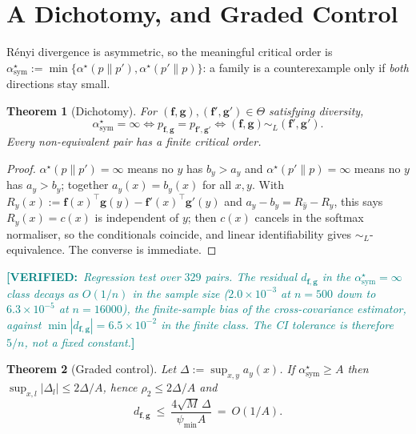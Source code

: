 \documentclass[10pt,letterpaper,twocolumn]{article}
\newcommand{\DONE}[1]{\textcolor{teal}{\small\textbf{[VERIFIED:}~\textit{#1}\textbf{]}}}
\newcommand{\bff}{\mathbf{f}}
\newcommand{\bfg}{\mathbf{g}}
\newcommand{\dfg}{d_{\bff,\bfg}}
\newcommand{\simL}{\sim_{L}}
\theoremstyle{plain}
\newtheorem{theorem}{Theorem}
\theoremstyle{definition}
\theoremstyle{remark}
\begin{document}
\section{A Dichotomy, and Graded Control}
\label{sec:dichotomy}

R\'enyi divergence is asymmetric, so the meaningful critical order is
$\alpha^{\star}_{\mathrm{sym}}:=\min\{\alpha^{\star}(p\|p'),
\alpha^{\star}(p'\|p)\}$: a family is a counterexample only if \emph{both}
directions stay small.

\begin{theorem}[Dichotomy]
\label{thm:dichotomy}
For $(\bff,\bfg),(\bff',\bfg')\in\Theta$ satisfying diversity,
\begin{equation}
\alpha^{\star}_{\mathrm{sym}}=\infty
\iff p_{\bff,\bfg}=p_{\bff',\bfg'}
\iff (\bff,\bfg)\simL(\bff',\bfg').
\end{equation}
Every non-equivalent pair has a \emph{finite} critical order.
\end{theorem}

\begin{proof}
$\alpha^{\star}(p\|p')=\infty$ means no $y$ has $b_{y}>a_{y}$ and
$\alpha^{\star}(p'\|p)=\infty$ means no $y$ has $a_{y}>b_{y}$; together
$a_{y}(x)=b_{y}(x)$ for all $x,y$. With
$R_{y}(x):=\bff(x)^{\top}\bfg(y)-\bff'(x)^{\top}\bfg'(y)$ and
$a_{y}-b_{y}=R_{\hat y}-R_{y}$, this says $R_{y}(x)=c(x)$ is independent of
$y$; then $c(x)$ cancels in the softmax normaliser, so the conditionals
coincide, and linear identifiability gives $\simL$-equivalence. The converse is
immediate.
\end{proof}

\DONE{Regression test over $329$ pairs. The residual $\dfg$ in the
$\alpha^{\star}_{\mathrm{sym}}=\infty$ class decays as $O(1/n)$ in the sample
size ($2.0\!\times\!10^{-3}$ at $n{=}500$ down to $6.3\!\times\!10^{-5}$ at
$n{=}16000$), the finite-sample bias of the cross-covariance estimator, against
$\min|\dfg|=6.5\times10^{-2}$ in the finite class. The CI tolerance is therefore
$5/n$, not a fixed constant.}

\begin{theorem}[Graded control]
\label{thm:graded}
Let $\Delta:=\sup_{x,y}a_{y}(x)$. If $\alpha^{\star}_{\mathrm{sym}}\ge A$ then
$\sup_{x,l}|\Delta_{l}|\le2\Delta/A$, hence $\rho_{2}\le2\Delta/A$ and
\begin{equation}
\dfg\ \le\ \frac{4\sqrt{M}\,\Delta}{\psi_{\min}A}\ =\ O(1/A).
\label{eq:graded}
\end{equation}
\end{theorem}
\end{document}
